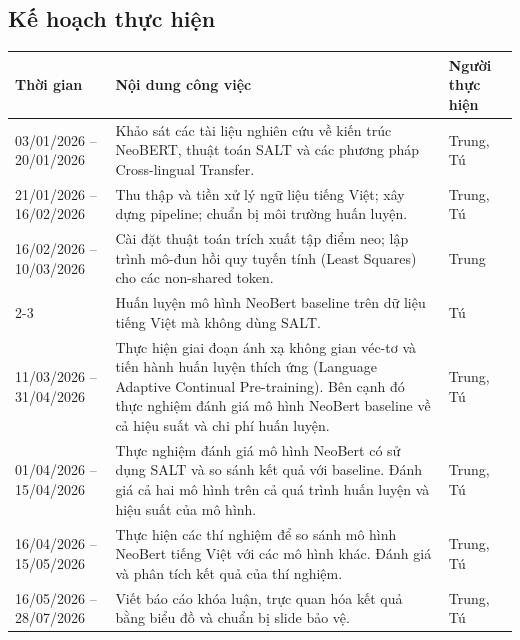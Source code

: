 \documentclass{article}[14pt]
\begin{document}
{    \subsection{Kế hoạch thực hiện}
        
    \begin{table}[h]
    \centering
    \begin{tabular}{|p{4.5cm}|p{8.5cm}|p{3cm}|}
    \hline
    \textbf{Thời gian} & \textbf{Nội dung công việc} & \textbf{Người thực hiện} \\ \hline
    03/01/2026 – 20/01/2026 & Khảo sát các tài liệu nghiên cứu về kiến trúc NeoBERT, thuật toán SALT và các phương pháp Cross-lingual Transfer. & Trung, Tú \\ \hline
    21/01/2026 – 16/02/2026 & Thu thập và tiền xử lý ngữ liệu tiếng Việt; xây dựng pipeline; chuẩn bị môi trường huấn luyện.& Trung, Tú \\ \hline
    16/02/2026 – 10/03/2026 & Cài đặt thuật toán trích xuất tập điểm neo; lập trình mô-đun hồi quy tuyến tính (Least Squares) cho các non-shared token. & Trung \\ \cline{2-3} 
     & Huấn luyện mô hình NeoBert baseline trên dữ liệu tiếng Việt mà không dùng SALT. & Tú \\ \hline
    11/03/2026 – 31/04/2026 & Thực hiện giai đoạn ánh xạ không gian véc-tơ và tiến hành huấn luyện thích ứng (Language Adaptive Continual Pre-training). Bên cạnh đó thực nghiệm đánh giá mô hình NeoBert baseline về cả hiệu suất và chi phí huấn luyện. & Trung, Tú \\ \hline
    01/04/2026 – 15/04/2026 & Thực nghiệm đánh giá mô hình NeoBert có sử dụng SALT và so sánh kết quả với baseline. Đánh giá cả hai mô hình trên cả quá trình huấn luyện và hiệu suất của mô hình. & Trung, Tú \\ \hline
    16/04/2026 – 15/05/2026 & Thực hiện các thí nghiệm để so sánh mô hình NeoBert tiếng Việt với các mô hình khác. Đánh giá và phân tích kết quả của thí nghiệm. & Trung, Tú \\ \hline
    16/05/2026 – 28/07/2026 & Viết báo cáo khóa luận, trực quan hóa kết quả bằng biểu đồ và chuẩn bị slide bảo vệ. & Trung, Tú \\ \hline
    \end{tabular}
    \end{table}
    
    
    }
    
    \pagebreak 
    
\end{document}
